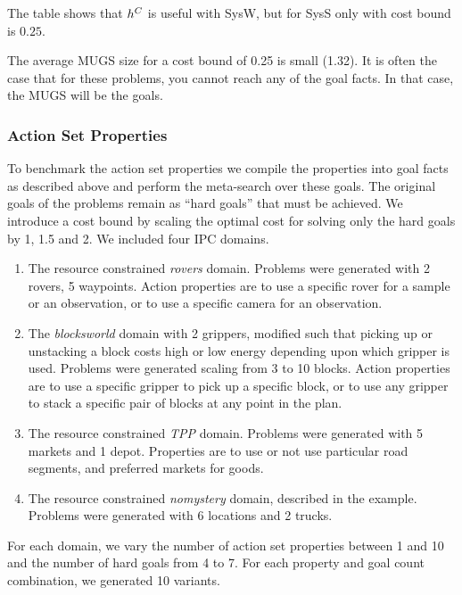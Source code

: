 The table shows that $h^C$ is useful with SysW, but for SysS only with cost bound is $0.25$.

The average MUGS size for a cost bound of 0.25 is small (1.32). It is often the case that for these problems, you cannot reach any of the goal facts. In that case, the MUGS will be the goals.





\subsubsection*{Action Set Properties}


To benchmark the action set properties we compile the properties into goal facts as described above and perform the meta-search over these goals. The original goals of the problems remain as ``hard goals'' that must be achieved.
We introduce a cost bound by scaling the optimal cost for solving only the hard goals by 1, 1.5 and 2.
We included four IPC domains.
\begin{enumerate}
\item The resource constrained \textit{rovers} domain. Problems were generated with 2 rovers, 5 waypoints. Action properties are to use a specific rover for a sample or an observation, or to use a specific camera for an observation. 
\item The \textit{blocksworld} domain with 2 grippers, modified such that picking up or unstacking a block costs high or low energy depending upon which gripper is used. Problems were generated scaling from 3 to 10 blocks. Action properties are to use a specific gripper to pick up a specific block, or to use any gripper to stack a specific pair of blocks at any point in the plan.
\item The resource constrained \textit{TPP} domain. Problems were generated with 5 markets and 1 depot. Properties are to use or not use particular road segments, and preferred markets for goods.
\item The resource constrained \textit{nomystery} domain, described in the example. Problems were generated with 6 locations and 2 trucks.
\end{enumerate}
For each domain, we vary the number of action set properties between 1 and 10 and the number of hard goals from 4 to 7. For each property and goal count combination, we generated 10 variants.

